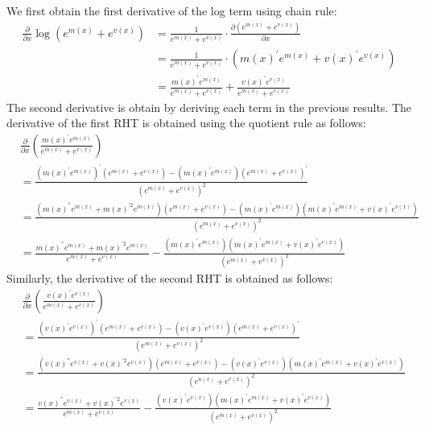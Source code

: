 We first obtain the first derivative of the log term using chain rule:
\begin{align}
    \frac{\partial}{\partial x} \log{\left(e^{m(x)} + e^{v(x)} \right)}  &=  \frac{1}{e^{m(x)} + e^{v(x)}} \cdot \frac{\partial \left(e^{m(x)} + e^{v(x)} \right)}{\partial x} \nonumber\\
    &= \frac{1}{e^{m(x)} + e^{v(x)}} \cdot \left(m(x)^{'} e^{m(x)} + v(x)^{'} e^{v(x)} \right) \nonumber\\
    &= \frac{m(x)^{'} e^{m(x)}}{e^{m(x)} + e^{v(x)}}  +  \frac{v(x)^{'} e^{v(x)}}{e^{m(x)} + e^{v(x)}}
\end{align}
The second derivative is obtain by deriving each term in the previous results. The derivative of the first RHT is obtained using the quotient rule as follows:
\begin{align}
&\frac{\partial}{\partial x} \left(\frac{m(x)^{'} e^{m(x)}}{e^{m(x)} + e^{v(x)}}\right)\nonumber\\
&= \frac{(m(x)^{'} e^{m(x)})^{'} (e^{m(x)} + e^{v(x)}) - (m(x)^{'} e^{m(x)}) (e^{m(x)} + e^{v(x)})^{'}}{(e^{m(x)} + e^{v(x)})^2}   \nonumber\\
&= \frac{(m(x)^{''} e^{m(x)} + m(x)^{'2} e^{m(x)})  (e^{m(x)} + e^{v(x)}) - (m(x)^{'} e^{m(x)}) (m(x)^{'}e^{m(x)} + v(x)^{'}e^{v(x)})}{(e^{m(x)} + e^{v(x)})^2}  \nonumber\\
&= \frac{m(x)^{''} e^{m(x)} + m(x)^{'2} e^{m(x)}}{e^{m(x)} + e^{v(x)}} - \frac{(m(x)^{'} e^{m(x)}) (m(x)^{'}e^{m(x)} + v(x)^{'}e^{v(x)})}{(e^{m(x)} + e^{v(x)})^2}
\end{align}
Similarly, the derivative of the second RHT is obtained as follows:
\begin{align}
&\frac{\partial}{\partial x} \left(\frac{v(x)^{'} e^{v(x)}}{e^{m(x)} + e^{v(x)}}\right) \nonumber\\
&= \frac{(v(x)^{'} e^{v(x)})^{'} (e^{m(x)} + e^{v(x)}) - (v(x)^{'} e^{v(x)}) (e^{m(x)} + e^{v(x)})^{'}}{(e^{m(x)} + e^{v(x)})^2}    \nonumber\\
&=\frac{(v(x)^{''} e^{v(x)}+v(x)^{'2} e^{v(x)}) (e^{m(x)} + e^{v(x)}) - (v(x)^{'} e^{v(x)}) (m(x)^{'}e^{m(x)} + v(x)^{'}e^{v(x)})}{(e^{u(x)} + e^{v(x)})^2}   \nonumber\\
&= \frac{v(x)^{''} e^{v(x)} + v(x)^{'2} e^{v(x)}}{e^{m(x)} + e^{v(x)}} - \frac{(v(x)^{'} e^{v(x)}) (m(x)^{'}e^{m(x)} + v(x)^{'}e^{v(x)})}{(e^{m(x)} + e^{v(x)})^2}
\end{align}

